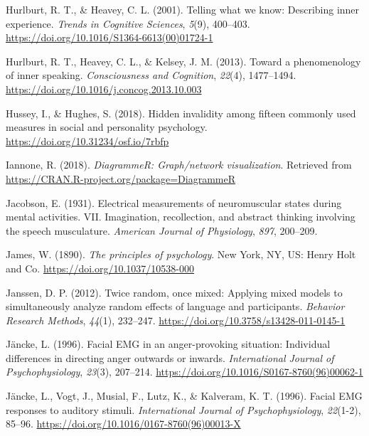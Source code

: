 \documentclass[a4paper,12pt,twoside,openright,oldfontcommands,final]{memoir}
\begin{document}
\leavevmode\hypertarget{ref-Hurlburt2001}{}%
Hurlburt, R. T., \& Heavey, C. L. (2001). Telling what we know: Describing inner experience. \emph{Trends in Cognitive Sciences}, \emph{5}(9), 400--403. \url{https://doi.org/10.1016/S1364-6613(00)01724-1}

\leavevmode\hypertarget{ref-Hurlburt2013}{}%
Hurlburt, R. T., Heavey, C. L., \& Kelsey, J. M. (2013). Toward a phenomenology of inner speaking. \emph{Consciousness and Cognition}, \emph{22}(4), 1477--1494. \url{https://doi.org/10.1016/j.concog.2013.10.003}

\leavevmode\hypertarget{ref-hussey_hidden_2018}{}%
Hussey, I., \& Hughes, S. (2018). Hidden invalidity among fifteen commonly used measures in social and personality psychology. \url{https://doi.org/10.31234/osf.io/7rbfp}

\leavevmode\hypertarget{ref-R-DiagrammeR}{}%
Iannone, R. (2018). \emph{DiagrammeR: Graph/network visualization}. Retrieved from \url{https://CRAN.R-project.org/package=DiagrammeR}

\leavevmode\hypertarget{ref-jacobson_electrical_1931}{}%
Jacobson, E. (1931). Electrical measurements of neuromuscular states during mental activities. VII. Imagination, recollection, and abstract thinking involving the speech musculature. \emph{American Journal of Physiology}, \emph{897}, 200--209.

\leavevmode\hypertarget{ref-james_principles_1890}{}%
James, W. (1890). \emph{The principles of psychology}. New York, NY, US: Henry Holt and Co. \url{https://doi.org/10.1037/10538-000}

\leavevmode\hypertarget{ref-janssen_twice_2012}{}%
Janssen, D. P. (2012). Twice random, once mixed: Applying mixed models to simultaneously analyze random effects of language and participants. \emph{Behavior Research Methods}, \emph{44}(1), 232--247. \url{https://doi.org/10.3758/s13428-011-0145-1}

\leavevmode\hypertarget{ref-Jancke1996a}{}%
Jäncke, L. (1996). Facial EMG in an anger-provoking situation: Individual differences in directing anger outwards or inwards. \emph{International Journal of Psychophysiology}, \emph{23}(3), 207--214. \url{https://doi.org/10.1016/S0167-8760(96)00062-1}

\leavevmode\hypertarget{ref-Jancke1996}{}%
Jäncke, L., Vogt, J., Musial, F., Lutz, K., \& Kalveram, K. T. (1996). Facial EMG responses to auditory stimuli. \emph{International Journal of Psychophysiology}, \emph{22}(1-2), 85--96. \url{https://doi.org/10.1016/0167-8760(96)00013-X}
\end{document}
